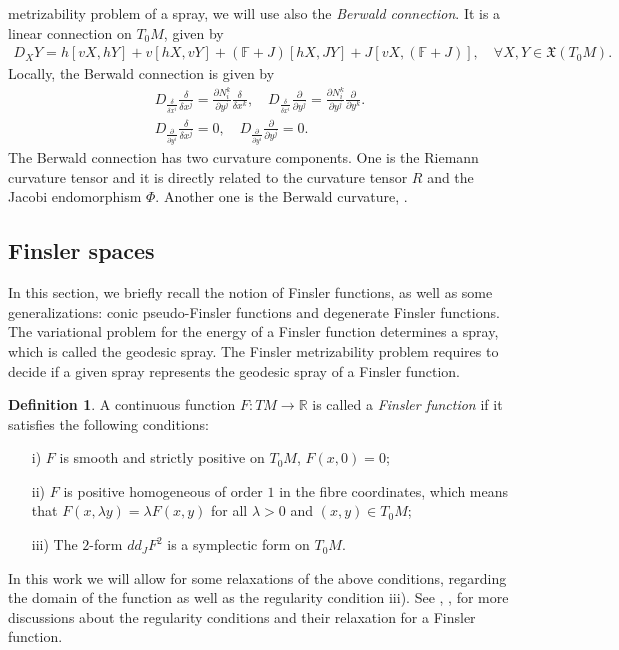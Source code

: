 \documentclass[oneside,english]{amsart}
\numberwithin{equation}{section}
\numberwithin{figure}{section}
\theoremstyle{plain}
\theoremstyle{plain}
\theoremstyle{definition}
\newtheorem{defn}[thm]{Definition}
\theoremstyle{plain}
\theoremstyle{plain}
\theoremstyle{plain}
\theoremstyle{remark}
\theoremstyle{remark}
\begin{document}
metrizability problem of a spray, we will use also the \emph{Berwald
  connection}. It is a linear connection on $T_0M$, given by 
\begin{eqnarray*}
  D_XY=h[vX, hY] + v[hX, vY] + (\mathbb{F} +J)[hX, JY] + J[vX,
  (\mathbb{F} +J)], \quad \forall X,Y \in
  \mathfrak{X}(T_0M). \end{eqnarray*}
Locally, the Berwald connection is given by 
\begin{eqnarray*}
  D_{\frac{\delta}{\delta x^i}} \frac{\delta}{\delta x^j} =
  \frac{\partial N^k_i}{\partial y^j} \frac{\delta}{\delta x^k}, \quad
  D_{\frac{\delta}{\delta x^i}} \frac{\partial }{\partial y^j} = 
  \frac{\partial N^k_i}{\partial y^j} \frac{\partial}{\partial y^k}.  \\
  D_{\frac{\partial}{\partial y^i}} \frac{\delta}{\delta x^j}
  = 0, \quad
  D_{\frac{\partial}{\partial y^i}} \frac{\partial }{\partial y^j} = 
  0. \end{eqnarray*}
The Berwald connection has two curvature components. One is the Riemann
curvature tensor and it is directly related to the curvature tensor $R$ and the Jacobi endomorphism
$\Phi$. Another one is the Berwald curvature, \cite[\S 7.1, \S
8.1]{Shen01}. 

\subsection{Finsler spaces}

In this section, we briefly recall the notion of Finsler functions, as well as
some generalizations: conic pseudo-Finsler functions and degenerate Finsler
functions. The variational problem for the energy of a Finsler
function determines a spray, which is called the geodesic spray. The
Finsler metrizability problem requires to decide if a given spray
represents the geodesic spray of a Finsler function.  

\begin{defn} 
  \label{Finsler}
  A continuous function $F:TM \to \mathbb{R}$ is called a \emph{Finsler
    function} if it satisfies the following conditions:
  \begin{itemize}
  \item[i)] $F$ is smooth and strictly positive on $T_0M$, $F(x,0)=0$;
  \item[ii)] $F$ is positive homogeneous of order $1$ in the fibre
    coordinates, which means that $F(x,\lambda y)=\lambda F(x,y)$ for
    all $\lambda > 0$ and $(x,y)\in T_0M$;
  \item[iii)] The $2$-form $dd_JF^2$ is a symplectic form on $T_0M$. 
  \end{itemize}
\end{defn}
In this work we will allow for some relaxations of the above conditions,
regarding the domain of the function as well as the regularity condition iii). See
\cite[\S 1.1.2, \S 1.2.1]{AIM93}, \cite{Bryant02}, \cite{JS12} for more
discussions about the regularity conditions and their relaxation for a Finsler
function.
\end{document}
